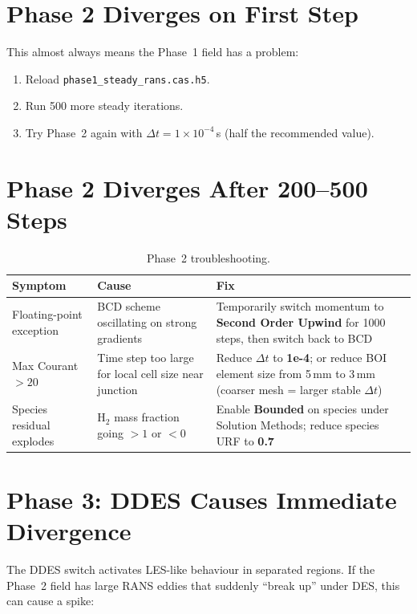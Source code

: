 \documentclass[12pt,a4paper]{report}
\begin{document}
\section{Phase 2 Diverges on First Step}

This almost always means the Phase~1 field has a problem:

\begin{enumerate}
  \item Reload \texttt{phase1\_steady\_rans.cas.h5}.
  \item Run 500 more steady iterations.
  \item Try Phase~2 again with $\Delta t = 1\!\times\!10^{-4}$\,s
        (half the recommended value).
\end{enumerate}


\section{Phase 2 Diverges After 200--500 Steps}

\begin{table}[H]
\centering
\caption{Phase~2 troubleshooting.}
\begin{tabularx}{\textwidth}{@{}lXX@{}}
\toprule
\textbf{Symptom} & \textbf{Cause} & \textbf{Fix} \\
\midrule
Floating-point exception &
  BCD scheme oscillating on strong gradients &
  Temporarily switch momentum to \textbf{Second Order Upwind} for
  1000 steps, then switch back to BCD \\
Max Courant $> 20$ &
  Time step too large for local cell size near junction &
  Reduce $\Delta t$ to \textbf{1e-4}; or reduce BOI element size
  from 5\,mm to 3\,mm (coarser mesh = larger stable $\Delta t$) \\
Species residual explodes &
  H$_2$ mass fraction going $> 1$ or $< 0$ &
  Enable \textbf{Bounded} on species under Solution Methods;
  reduce species URF to \textbf{0.7} \\
\bottomrule
\end{tabularx}
\end{table}


\section{Phase 3: DDES Causes Immediate Divergence}

The DDES switch activates LES-like behaviour in separated regions.
If the Phase~2 field has large RANS eddies that suddenly ``break up''
under DES, this can cause a spike:
\end{document}
